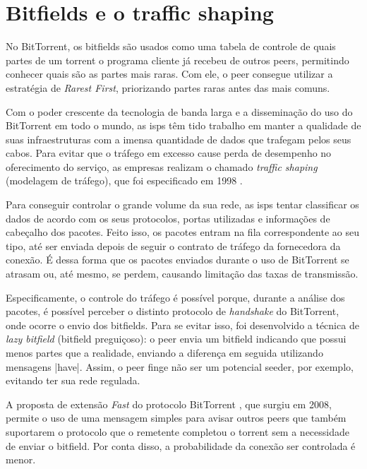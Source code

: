 
\newpage
\section{Bitfields e o traffic shaping}
\label{sec:bitfield}

No BitTorrent, os bitfields são usados como uma tabela de controle de quais partes de um
\gls*{torrent} o programa cliente já recebeu de outros \glspl*{peer}, permitindo
conhecer quais são as partes mais raras. Com ele, o \gls*{peer} consegue utilizar a
estratégia de \emph{Rarest First}, priorizando partes raras antes das mais comuns.

Com o poder crescente da tecnologia de banda larga e a disseminação do uso do
BitTorrent em todo o mundo, as \glspl{isp} têm tido trabalho em manter a qualidade de
suas infraestruturas com a imensa quantidade de dados que trafegam pelos seus cabos.
Para evitar que o tráfego em excesso cause perda de desempenho no oferecimento do
serviço, as empresas realizam o chamado \emph{traffic shaping} (modelagem de tráfego),
que foi especificado em 1998 \cite{site:rfcshaping}.

Para conseguir controlar o grande volume da sua rede, as \glspl*{isp} tentar
classificar os dados de acordo com os seus protocolos, portas utilizadas e informações
de cabeçalho dos pacotes. Feito isso, os pacotes entram na fila correspondente ao seu
tipo, até ser enviada depois de seguir o contrato de tráfego da fornecedora da conexão.
É dessa forma que os pacotes enviados durante o uso de BitTorrent se atrasam ou, até
mesmo, se perdem, causando limitação das taxas de transmissão.

Especificamente, o controle do tráfego é possível porque, durante a análise dos
pacotes, é possível perceber o distinto protocolo de \emph{handshake} do BitTorrent,
onde ocorre o envio dos bitfields. Para se evitar isso, foi desenvolvido a técnica de
\emph{lazy bitfield} (bitfield preguiçoso): o \gls*{peer} envia um bitfield indicando
que possui menos partes que a realidade, enviando a diferença em seguida utilizando
mensagens \bverb|have|. Assim, o \gls*{peer} finge não ser um potencial \gls{seeder},
por exemplo, evitando ter sua rede regulada.

A proposta de extensão \emph{Fast} do protocolo BitTorrent \cite{site:bittorrent-fast},
que surgiu em 2008, permite o uso de uma mensagem simples para avisar outros
\glspl*{peer} que também suportarem o protocolo que o remetente completou o
\gls*{torrent} sem a necessidade de enviar o bitfield. Por conta disso, a probabilidade
da conexão ser controlada é menor.